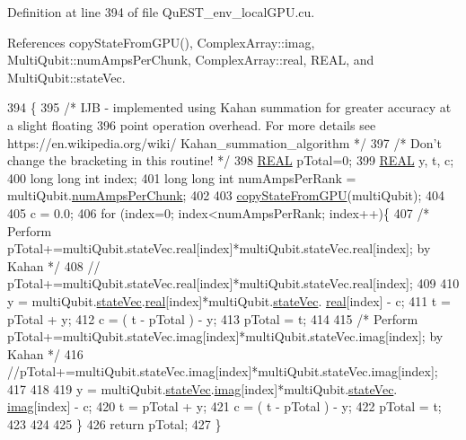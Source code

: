 Definition at line 394 of file Qu\+E\+S\+T\+\_\+env\+\_\+local\+G\+P\+U.\+cu.



References copy\+State\+From\+G\+P\+U(), Complex\+Array\+::imag, Multi\+Qubit\+::num\+Amps\+Per\+Chunk, Complex\+Array\+::real, R\+E\+AL, and Multi\+Qubit\+::state\+Vec.


\begin{DoxyCode}
394                                                 \{
395     \textcolor{comment}{/* IJB - implemented using Kahan summation for greater accuracy at a slight floating}
396 \textcolor{comment}{       point operation overhead. For more details see https://en.wikipedia.org/wiki/
      Kahan\_summation\_algorithm */}
397     \textcolor{comment}{/* Don't change the bracketing in this routine! */}
398     \mbox{\hyperlink{QuEST__precision_8h_a4b654506f18b8bfd61ad2a29a7e38c25}{REAL}} pTotal=0;
399     \mbox{\hyperlink{QuEST__precision_8h_a4b654506f18b8bfd61ad2a29a7e38c25}{REAL}} y, t, c;
400     \textcolor{keywordtype}{long} \textcolor{keywordtype}{long} \textcolor{keywordtype}{int} index;
401     \textcolor{keywordtype}{long} \textcolor{keywordtype}{long} \textcolor{keywordtype}{int} numAmpsPerRank = multiQubit.\mbox{\hyperlink{structMultiQubit_a1cad83601a78635dd278259c7ed54f18}{numAmpsPerChunk}};
402 
403     \mbox{\hyperlink{QuEST__env__localGPU_8cu_a0d255fec1e375244d4cb980fac92621d}{copyStateFromGPU}}(multiQubit);
404 
405     c = 0.0;
406     \textcolor{keywordflow}{for} (index=0; index<numAmpsPerRank; index++)\{
407         \textcolor{comment}{/* Perform pTotal+=multiQubit.stateVec.real[index]*multiQubit.stateVec.real[index]; by Kahan */}
408         \textcolor{comment}{// pTotal+=multiQubit.stateVec.real[index]*multiQubit.stateVec.real[index];}
409 
410         y = multiQubit.\mbox{\hyperlink{structMultiQubit_a45483190d6b01ef6b2f98f2bec9ab94f}{stateVec}}.\mbox{\hyperlink{structComplexArray_a4195cac6c784ea1b6271f1c7dba1548a}{real}}[index]*multiQubit.\mbox{\hyperlink{structMultiQubit_a45483190d6b01ef6b2f98f2bec9ab94f}{stateVec}}.
      \mbox{\hyperlink{structComplexArray_a4195cac6c784ea1b6271f1c7dba1548a}{real}}[index] - c;
411         t = pTotal + y;
412         c = ( t - pTotal ) - y;
413         pTotal = t;
414 
415         \textcolor{comment}{/* Perform pTotal+=multiQubit.stateVec.imag[index]*multiQubit.stateVec.imag[index]; by Kahan */}
416         \textcolor{comment}{//pTotal+=multiQubit.stateVec.imag[index]*multiQubit.stateVec.imag[index];}
417 
418 
419         y = multiQubit.\mbox{\hyperlink{structMultiQubit_a45483190d6b01ef6b2f98f2bec9ab94f}{stateVec}}.\mbox{\hyperlink{structComplexArray_a79dde47c7ae530c79cebfdf57b225968}{imag}}[index]*multiQubit.\mbox{\hyperlink{structMultiQubit_a45483190d6b01ef6b2f98f2bec9ab94f}{stateVec}}.
      \mbox{\hyperlink{structComplexArray_a79dde47c7ae530c79cebfdf57b225968}{imag}}[index] - c;
420         t = pTotal + y;
421         c = ( t - pTotal ) - y;
422         pTotal = t;
423 
424 
425     \}
426     \textcolor{keywordflow}{return} pTotal;
427 \}
\end{DoxyCode}
